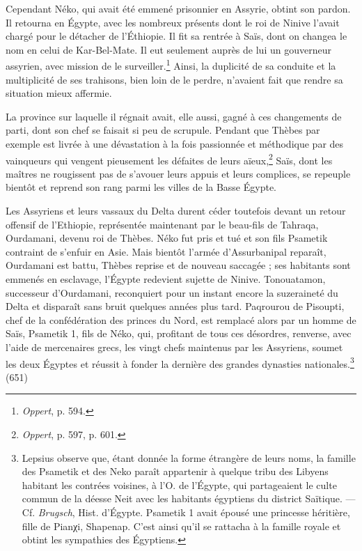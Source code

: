 \documentclass[letterpaper,twocolumn,openany,nodeprecatedcode]{dndbook}
\begin{document}
Cependant Néko, qui avait été emmené prisonnier en Assyrie, obtint son pardon. Il retourna en Égypte, avec les nombreux présents dont le roi de Ninive l'avait chargé pour le détacher de l'Éthiopie. Il fit sa rentrée à Saïs, dont on changea le nom en celui de Kar-Bel-Mate. Il eut seulement auprès de lui un gouverneur assyrien, avec mission de le surveiller.\footnote{\emph{Oppert}, p. 594.} Ainsi, la duplicité de sa conduite et la multiplicité de ses trahisons, bien loin de le perdre, n'avaient fait que rendre sa situation mieux affermie.

La province sur laquelle il régnait avait, elle aussi, gagné à ces changements de parti, dont son chef se faisait si peu de scrupule. Pendant que Thèbes par exemple est livrée à une dévastation à la fois passionnée et méthodique par des vainqueurs qui vengent pieusement les défaites de leurs aïeux,\footnote{\emph{Oppert}, p. 597, p. 601.} Saïs, dont les maîtres ne rougissent pas de s'avouer leurs appuis et leurs complices, se repeuple bientôt et reprend son rang parmi les villes de la Basse Égypte.

Les Assyriens et leurs vassaux du Delta durent céder toutefois devant un retour offensif de l'Ethiopie, représentée maintenant par le beau-fils de Tahraqa, Ourdamani, devenu roi de Thèbes. Néko fut pris et tué et son fils Psametik contraint de s'enfuir en Asie. Mais bientôt l'armée d'Assurbanipal reparaît, Ourdamani est battu, Thèbes reprise et de nouveau saccagée ; ses habitants sont emmenés en esclavage, l'Égypte redevient sujette de Ninive. Tonouatamon, successeur d'Ourdamani, reconquiert pour un instant encore la suzeraineté du Delta et disparaît sans bruit quelques années plus tard. Paqrourou de Pisoupti, chef de la confédération des princes du Nord, est remplacé alors par un homme de Saïs, Psametik 1, fils de Néko, qui, profitant de tous ces désordres, renverse, avec l'aide de mercenaires grecs, les vingt chefs maintenus par les Assyriens, soumet les deux Égyptes et réussit à fonder la dernière des grandes dynasties nationales.\footnote{Lepsius observe que, étant donnée la forme étrangère de leurs noms, la famille des Psametik et des Neko paraît appartenir à quelque tribu des Libyens habitant les contrées voisines, à l'O. de l'Égypte, qui partageaient le culte commun de la déesse Neit avec les habitants égyptiens du district Saïtique. --- Cf. \emph{Brugsch}, Hist. d'Égypte. Psametik 1 avait épousé une princesse héritière, fille de Pianχi, Shapenap. C'est ainsi qu'il se rattacha à la famille royale et obtint les sympathies des Égyptiens.} (651)
\end{document}

